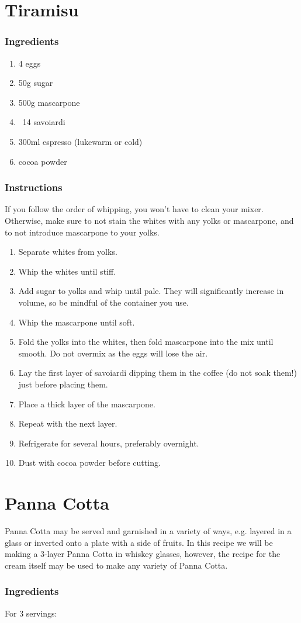 \documentclass[11pt]{report}
\newcommand{\header}[1]{\subsubsection*{#1}}
\begin{document}
\section{Tiramisu}

\header{Ingredients}
\begin{enumerate}
  \item 4 eggs
  \item 50g sugar
  \item 500g mascarpone
  \item ~14 savoiardi
  \item 300ml espresso (lukewarm or cold)
  \item cocoa powder
\end{enumerate}

\header{Instructions}
If you follow the order of whipping, you won't have to clean your mixer.
Otherwise, make sure to not stain the whites with any yolks or mascarpone,
and to not introduce mascarpone to your yolks.
\begin{enumerate}
  \item Separate whites from yolks.
  \item Whip the whites until stiff.
  \item Add sugar to yolks and whip until pale. They will significantly
  increase in volume, so be mindful of the container you use.
  \item Whip the mascarpone until soft.
  \item Fold the yolks into the whites, then fold mascarpone into the mix until
   smooth. Do not overmix as the eggs will lose the air.
  \item Lay the first layer of savoiardi dipping them in the coffee (do not soak
   them!) just before placing them.
  \item Place a thick layer of the mascarpone.
  \item Repeat with the next layer.
  \item Refrigerate for several hours, preferably overnight.
  \item Dust with cocoa powder before cutting.
\end{enumerate}

\section{Panna Cotta}
Panna Cotta may be served and garnished in a variety of ways, e.g. layered in a
glass or inverted onto a plate with a side of fruits. In this recipe we will be
making a 3-layer Panna Cotta in whiskey glasses, however, the recipe for the
cream itself may be used to make any variety of Panna Cotta.
\header{Ingredients}
For 3 servings:
\end{document}
